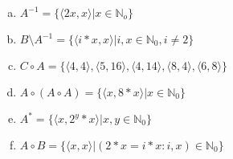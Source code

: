 \documentclass{article} %
\begin{document}
\begin{enumerate}[(a)]
	\item
	$ A^{-1} = \{\langle 2x,x \rangle \lvert x \in \mathbb N_o \}$
	\item
	$ B \setminus A^{-1} = \{\langle i*x,x \rangle \lvert i,x \in \mathbb N_0, i \neq 2\}$
	\item
	$C \circ A = \{\langle 4,4 \rangle,\langle 5,16 \rangle, \langle 4,14\rangle, \langle 8,4 \rangle,\langle 6,8\rangle\}$
	\item
	$A \circ (A \circ A) = \{ \langle x,8*x\rangle\lvert x\in \mathbb N_0\}$
 	\item
	 $A^{*} = \{\langle x ,2^y*x\rangle\lvert x,y \in \mathbb N_0\}$
	 \item 
	 $A \circ B = \{\langle x,x\rangle \lvert (2*x = i*x : i,x) \in \mathbb N_0\}$

\end{enumerate}
\end{document}
